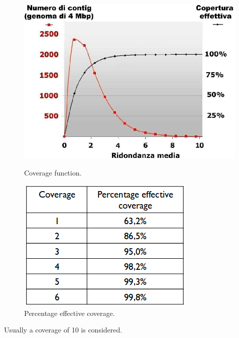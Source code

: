 	\begin{figure}[H]
	\begin{minipage}[t]{0.45\linewidth}
		\centering
		\includegraphics[width=\textwidth]{img/coverage}
		\caption{Coverage function.}
	\end{minipage}
	\hspace{1.8cm}
	\begin{minipage}[t]{0.42\linewidth} 
		\centering
		\includegraphics[width=\textwidth]{img/coverage_table}
		\caption{Percentage effective coverage.}
	\end{minipage}        
\end{figure}
\FloatBarrier
Usually a coverage of 10 is considered.

